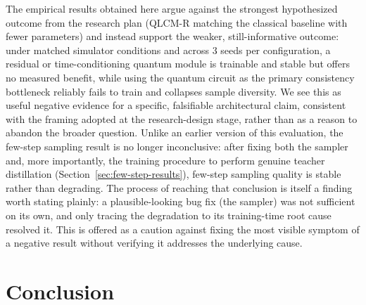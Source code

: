 \documentclass[11pt]{article}
\begin{document}
The empirical results obtained here argue against the strongest hypothesized
outcome from the research plan (QLCM-R matching the classical baseline with
fewer parameters) and instead support the weaker, still-informative outcome:
under matched simulator conditions and across 3 seeds per configuration, a
residual or time-conditioning quantum module is trainable and stable but
offers no measured benefit, while using the quantum circuit as the primary
consistency bottleneck reliably fails to train and collapses sample
diversity. We see this as useful negative evidence for a specific,
falsifiable architectural claim, consistent with the framing adopted at the
research-design stage, rather than as a reason to abandon the broader
question. Unlike an earlier version of this evaluation, the few-step sampling
result is no longer inconclusive: after fixing both the sampler and, more
importantly, the training procedure to perform genuine teacher distillation
(Section~\ref{sec:few-step-results}), few-step sampling quality is stable rather than degrading. The
process of reaching that conclusion is itself a finding worth stating
plainly: a plausible-looking bug fix (the sampler) was not sufficient on its
own, and only tracing the degradation to its training-time root cause
resolved it. This is offered as a caution against fixing the most visible
symptom of a negative result without verifying it addresses the underlying
cause.

\section{Conclusion}
\end{document}
